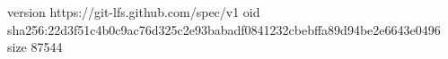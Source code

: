 version https://git-lfs.github.com/spec/v1
oid sha256:22d3f51c4b0c9ac76d325c2e93babadf0841232cbebffa89d94be2e6643e0496
size 87544
